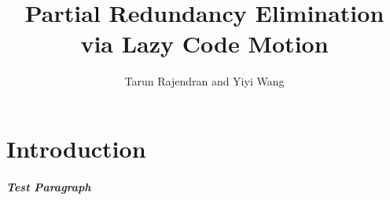 \documentclass{report}
\author{Tarun Rajendran and Yiyi Wang}
\title{Partial Redundancy Elimination via Lazy Code Motion}
\begin{document}
\maketitle
\tableofcontents

\chapter{Introduction}
\paragraph{Test Paragraph}
\end{document}

